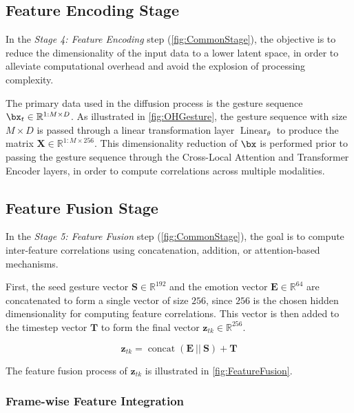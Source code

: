 \subsection{Feature Encoding Stage}

In the \textit{Stage 4: Feature Encoding} step (\autoref{fig:CommonStage}), the objective is to reduce the dimensionality of the input data to a lower latent space, in order to alleviate computational overhead and avoid the explosion of processing complexity.

The primary data used in the diffusion process is the gesture sequence $\bx_t \in \mathbb{R}^{1:M \times D}$. As illustrated in \autoref{fig:OHGesture}, the gesture sequence with size $M \times D$ is passed through a linear transformation layer $\operatorname{Linear}_{\theta}$ to produce the matrix $\mathbf{X} \in \mathbb{R}^{1:M \times 256}$. This dimensionality reduction of $\bx$ is performed prior to passing the gesture sequence through the Cross-Local Attention and Transformer Encoder layers, in order to compute correlations across multiple modalities.

\subsection{Feature Fusion Stage}

In the \textit{Stage 5: Feature Fusion} step (\autoref{fig:CommonStage}), the goal is to compute inter-feature correlations using concatenation, addition, or attention-based mechanisms.

First, the seed gesture vector $\mathbf{S} \in \mathbb{R}^{192}$ and the emotion vector $\mathbf{E} \in \mathbb{R}^{64}$ are concatenated to form a single vector of size $256$, since $256$ is the chosen hidden dimensionality for computing feature correlations. This vector is then added to the timestep vector $\mathbf{T}$ to form the final vector $\mathbf{z}_{tk} \in \mathbb{R}^{256}$.


\begin{equation}
	\label{eq:ConditionConcat}
	\mathbf{z}_{tk} = \operatorname{concat }(\mathbf{E}\ || \  \mathbf{S}) + \mathbf{T}
\end{equation}

The feature fusion process of $\mathbf{z}_{tk}$ is illustrated in \autoref{fig:FeatureFusion}.

\subsubsection{Frame-wise Feature Integration}

